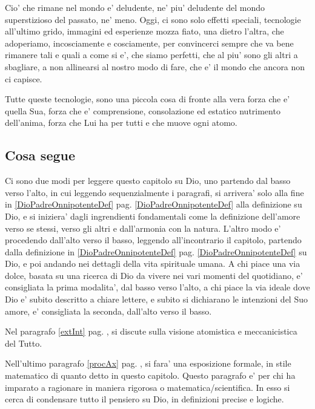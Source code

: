 Cio' che rimane nel mondo e' deludente, ne' piu' deludente del mondo superstizioso del passato, ne' meno. Oggi, ci sono solo effetti speciali, tecnologie all'ultimo grido, immagini ed esperienze mozza fiato, una dietro l'altra, che adoperiamo, incosciamente e cosciamente, per convincerci sempre che va bene rimanere tali e quali a come si e', che siamo perfetti, che al piu' sono gli altri a sbagliare, a non allinearsi al nostro modo di fare, che e' il mondo che ancora non ci capisce.

Tutte queste tecnologie, sono una piccola cosa di fronte alla vera forza che e' quella Sua, forza che e' comprensione, consolazione ed estatico nutrimento dell'anima, forza che Lui ha per tutti e che muove ogni atomo.

\subsection{Cosa segue}

Ci sono due modi per leggere questo capitolo su Dio, uno partendo dal basso verso l'alto, in cui leggendo sequenzialmente i paragrafi, si arrivera' solo alla fine in \ref{DioPadreOnnipotenteDef} pag. \ref{DioPadreOnnipotenteDef} alla definizione su Dio, e si iniziera' dagli ingrendienti fondamentali come la definizione dell'amore verso se stessi, verso gli altri e dall'armonia con la natura. L'altro modo e' procedendo dall'alto verso il basso, leggendo all'incontrario il capitolo, partendo dalla definizione in \ref{DioPadreOnnipotenteDef} pag. \ref{DioPadreOnnipotenteDef} su Dio, e poi andando nei dettagli della vita spirituale umana. A chi piace una via dolce, basata su una ricerca di Dio da vivere nei vari momenti del quotidiano, e' consigliata la prima modalita', dal basso verso l'alto, a chi piace la via ideale dove Dio e' subito descritto a chiare lettere, e subito si dichiarano le intenzioni del Suo amore, e' consigliata la seconda, dall'alto verso il basso.

Nel paragrafo \ref{extInt} pag. \pageref{extInt}, si discute sulla visione atomistica e meccanicistica del Tutto.

Nell'ultimo paragrafo \ref{procAx} pag. \pageref{procAx}, si fara' una esposizione formale, in stile matematico di quanto detto in questo capitolo. Questo paragrafo e' per chi ha imparato a ragionare in maniera rigorosa o matematica/scientifica. In esso si cerca di condensare tutto il pensiero su Dio, in definizioni precise e logiche.

